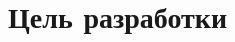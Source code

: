 \section{Цель разработки}

\headingtextsep

\underline{\hspace{\textwidth}}

\underline{\hspace{\textwidth}}

\underline{\hspace{\textwidth}}
